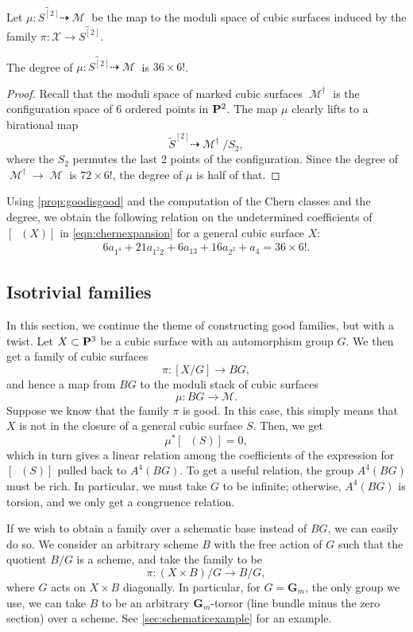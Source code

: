 \documentclass[12pt,reqno]{amsart}
\DeclareMathOperator{\Orb}{\overline{Orb}}
\DeclareMathOperator{\M}{\mathcal{M}}
\renewcommand{\to}{{\longrightarrow}}
\numberwithin{equation}{section}
\newcommand{\G}{\mathbf G}
\begin{document}
Let $\mu \colon \widetilde{S^{[2]}} \dashrightarrow \M$ be the map to the moduli space of cubic surfaces induced by the family $\pi \colon \mathcal X \to \widetilde{S^{[2]}}$.
\begin{proposition}
  The degree of $\mu \colon \widetilde{S^{[2]}} \dashrightarrow \M$ is $36 \times 6!$.
\end{proposition}
\begin{proof}
  Recall that the moduli space of marked cubic surfaces $\M^\dagger$ is the configuration space of 6 ordered points in $\P^2$.
  The map $\mu$ clearly lifts to a birational map
  \[ \widetilde S^{[2]} \dashrightarrow \M^\dagger / S_2,\]
  where the $S_2$ permutes the last 2 points of the configuration.
  Since the degree of $\M^\dagger \to \M$ is  $72 \times 6!$, the degree of $\mu$ is half of that.
\end{proof}

Using \autoref{prop:goodisgood} and the computation of the Chern classes and the degree, we obtain the following relation on the undetermined coefficients of $[\Orb(X)]$ in
\eqref{eqn:chernexpansion} for a general cubic surface $X$:
\begin{align}
  \label{eq:relation4}
  6 a_{1^{4}} + 21 a_{1^{2}2} + 6a_{13} + 16a_{2^2}+  a_{4} = 36 \times 6!.
\end{align}

\subsection{Isotrivial families}
In this section, we continue the theme of constructing good families, but with a twist.
Let $X \subset \P^3$ be a cubic surface with an automorphism group $G$.
We then get a family of cubic surfaces
\[ \pi \colon [X/G] \to BG,\]
and hence a map from $BG$ to the moduli stack of cubic surfaces
\[ \mu \colon BG \to \mathscr M.\]
Suppose we know that the family $\pi$ is good.
In this case, this simply means that $X$ is not in the closure of a general cubic surface $S$.
Then, we get
\[ \mu^* [\Orb(S)] = 0,\]
which in turn gives a linear relation among the coefficients of the expression for $[\Orb(S)]$ pulled back to $A^4(BG)$.
To get a useful relation, the group $A^4(BG)$ must be rich.
In particular, we must take $G$ to be infinite; otherwise, $A^4(BG)$ is torsion, and we only get a congruence relation.

If we wish to obtain a family over a schematic base instead of $BG$, we can easily do so.
We consider an arbitrary scheme $B$ with the free action of $G$ such that the quotient $B/G$ is a scheme, and take the family to be
\[ \pi \colon (X \times B)/G \to B/G,\]
where $G$ acts on $X \times B$ diagonally.
In particular, for $G = \G_m$, the only group we use, we can take $B$ to be an arbitrary $\G_m$-torsor (line bundle minus the zero section) over a scheme.
See \autoref{sec:schematicexample} for an example.
\end{document}
